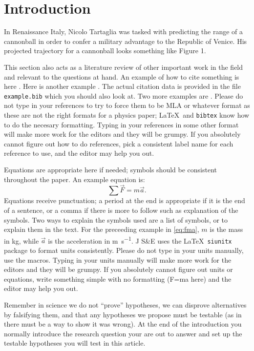 \documentclass[amsmath,amssymb,aps,endfloats,linenumbers]{revtex4-2}
\begin{document}
\section{Introduction}
In Renaissance Italy, Nicolo Tartaglia was tasked with predicting the range of a cannonball in order to confer a military advantage to the Republic of Venice. His projected trajectory for a cannonball looks something like Figure 1.

This section also acts as a literature review of other important work in the field and relevant to the questions at hand. An example of how to cite something is here \cite{tipler}. Here is another example \cite{openstax}. The actual citation data is provided in the file \texttt{example.bib} which you should also look at. Two more examples are \cite{rombauer:1931:joy, binzel:1988:hemispherical}. Please do not type in your references to try to force them to be MLA or whatever format as these are not the right formats for a physics paper; \LaTeX\ and \texttt{bibtex} know how to do the necesary formatting. Typing in your references in some other format will make more work for the editors and they will be grumpy. If you absolutely cannot figure out how to do references, pick a consistent label name for each reference to use, and the editor may help you out. 

Equations are appropriate here if needed; symbols should be consistent throughout the paper. An example equation is:
\begin{equation}
\sum \vec{F} = m \vec{a}.
\label{eq:fma} %
\end{equation}
Equations receive punctuation; a period at the end is appropriate if it is the end of a sentence, or a comma if there is more to follow such as explanation of the symbols. Two ways to explain the symbols used are a list of symbols, or to explain them in the text. For the preceeding example in \cref{eq:fma}, $m$ is the mass in \unit{\kilo\gram}, while $\vec{a}$ is the acceleration in \unit{\meter\per\second}. J S\&E uses the \LaTeX\ \texttt{siunitx} package to format units consistently. Please do not type in your units manually, use the macros. Typing in your units manually will make more work for the editors and they will be grumpy. If you absolutely cannot figure out units or equations, write something simple with no formatting (F=ma here) and the editor may help you out. 

Remember in science we do not ``prove'' hypotheses, we can disprove alternatives by falsifying them, and that any hypotheses we propose must be testable (as in there must be a way to show it was wrong). At the end of the introduction you normally introduce the research question your are out to answer and set up the testable hypotheses you will test in this article. 
\end{document}
